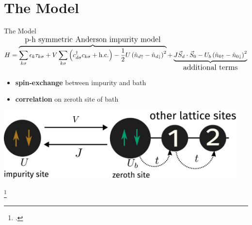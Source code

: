 \documentclass[10pt,aspectratio=169]{beamer}
\newcommand{\focus}[1]{\textcolor{lblue}{\textbf{#1}}}
\begin{document}
\section{The Model}
\label{the-model}
\begin{frame}[noframenumbering]{The Model}
\centering
	{\large\(H = \overbrace{\sum_{k\sigma}\epsilon_k \tau_{k\sigma} + V \sum_{k\sigma}\left(c^\dagger_{d\sigma}c_{k\sigma} + \text{h.c.}\right)  - \frac{1}{2}U \left(\hat n_{d \uparrow} - \hat n_{d \downarrow}\right)^2}^\text{\large p-h symmetric Anderson impurity model} + \underbrace{J \vec{S}_d\cdot\vec{S}_0 - U_b \left(\hat n_{0 \uparrow} - \hat n_{0 \downarrow}\right)^2}_\text{\large additional terms}\)}

\vspace*{\fill}
\hspace*{-25pt}
\begin{minipage}{0.39\textwidth}
\begin{itemize}
	\item \focus{spin-exchange} between impurity and bath
	\item \focus{correlation} on zeroth site of bath
\end{itemize}
\end{minipage}
\begin{minipage}{0.6\textwidth}
\hspace*{15pt}
\includegraphics[width=0.95\textwidth]{figures/zeromode_bare.pdf}
\end{minipage}

\footcite{Schrieffer_Wolff,anderson_impurity_1961}

\end{frame}
\end{document}
